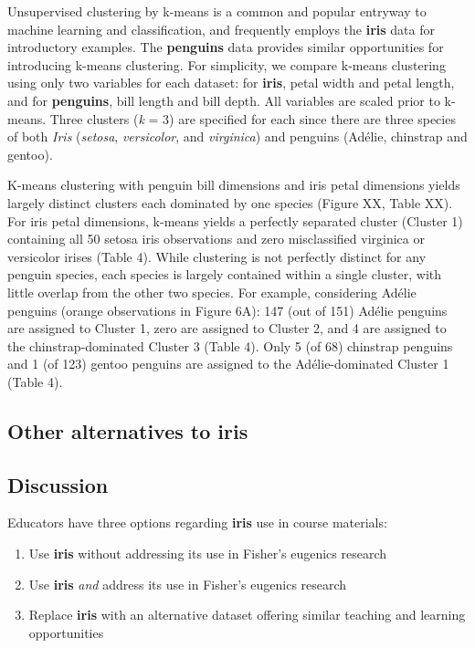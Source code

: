 Unsupervised clustering by k-means is a common and popular entryway to
machine learning and classification, and frequently employs the
\textbf{iris} data for introductory examples. The \textbf{penguins} data
provides similar opportunities for introducing k-means clustering. For
simplicity, we compare k-means clustering using only two variables for
each dataset: for \textbf{iris}, petal width and petal length, and for
\textbf{penguins}, bill length and bill depth. All variables are scaled
prior to k-means. Three clusters (\emph{k} = 3) are specified for each
since there are three species of both \emph{Iris} (\emph{setosa},
\emph{versicolor}, and \emph{virginica}) and penguins (Adélie, chinstrap
and gentoo).

K-means clustering with penguin bill dimensions and iris petal
dimensions yields largely distinct clusters each dominated by one
species (Figure XX, Table XX). For iris petal dimensions, k-means yields
a perfectly separated cluster (Cluster 1) containing all 50 setosa iris
observations and zero misclassified virginica or versicolor irises
(Table 4). While clustering is not perfectly distinct for any penguin
species, each species is largely contained within a single cluster, with
little overlap from the other two species. For example, considering
Adélie penguins (orange observations in Figure 6A): 147 (out of 151)
Adélie penguins are assigned to Cluster 1, zero are assigned to Cluster
2, and 4 are assigned to the chinstrap-dominated Cluster 3 (Table 4).
Only 5 (of 68) chinstrap penguins and 1 (of 123) gentoo penguins are
assigned to the Adélie-dominated Cluster 1 (Table 4).

\hypertarget{other-alternatives-to-iris}{%
\subsection{Other alternatives to
iris}\label{other-alternatives-to-iris}}

\hypertarget{discussion}{%
\subsection{Discussion}\label{discussion}}

Educators have three options regarding \textbf{iris} use in course
materials:

\begin{enumerate}
\def\labelenumi{\arabic{enumi}.}
\tightlist
\item
  Use \textbf{iris} without addressing its use in Fisher's eugenics
  research
\item
  Use \textbf{iris} \emph{and} address its use in Fisher's eugenics
  research
\item
  Replace \textbf{iris} with an alternative dataset offering similar
  teaching and learning opportunities
\end{enumerate}

